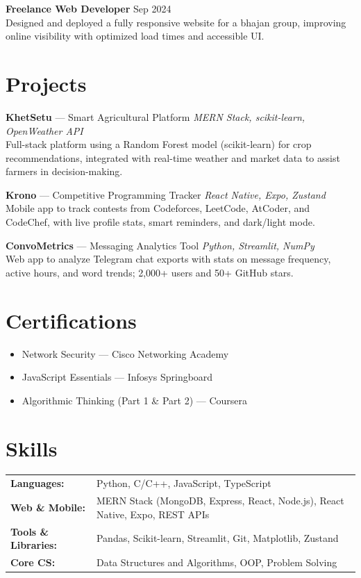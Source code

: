 \documentclass[a4paper,10pt]{article}
\begin{document}
\textbf{Freelance Web Developer} \hfill Sep 2024 \\
Designed and deployed a fully responsive website for a bhajan group, improving online visibility with optimized load times and accessible UI.

\section*{Projects}
\textbf{KhetSetu} — Smart Agricultural Platform \hfill \textit{MERN Stack, scikit-learn, OpenWeather API} \href{https://github.com/MeetThakur/Khetsetu}{\faGithub}\\
Full-stack platform using a Random Forest model (scikit-learn) for crop recommendations, integrated with real-time weather and market data to assist farmers in decision-making.

\textbf{Krono} — Competitive Programming Tracker \hfill \textit{React Native, Expo, Zustand} \href{https://github.com/MeetThakur/Krono}{\faGithub}\\
Mobile app to track contests from Codeforces, LeetCode, AtCoder, and CodeChef, with live profile stats, smart reminders, and dark/light mode.

\textbf{ConvoMetrics} — Messaging Analytics Tool \hfill \textit{Python, Streamlit, NumPy} \href{https://github.com/MeetThakur/ConvoMetrics}{\faGithub}\\
Web app to analyze Telegram chat exports with stats on message frequency, active hours, and word trends; 2,000+ users and 50+ GitHub stars.

\section*{Certifications}
\begin{itemize}[leftmargin=0.4cm, itemsep=0pt, topsep=2pt]
    \item Network Security — Cisco Networking Academy
    \item JavaScript Essentials — Infosys Springboard
    \item Algorithmic Thinking (Part 1 \& Part 2) — Coursera
\end{itemize}

\section*{Skills}
\begin{tabularx}{\textwidth}{@{}lX@{}}
\textbf{Languages:} & Python, C/C++, JavaScript, TypeScript \\
\textbf{Web \& Mobile:} & MERN Stack (MongoDB, Express, React, Node.js), React Native, Expo, REST APIs \\
\textbf{Tools \& Libraries:} & Pandas, Scikit-learn, Streamlit, Git, Matplotlib, Zustand \\
\textbf{Core CS:} & Data Structures and Algorithms, OOP, Problem Solving \\
\end{tabularx}
\end{document}
